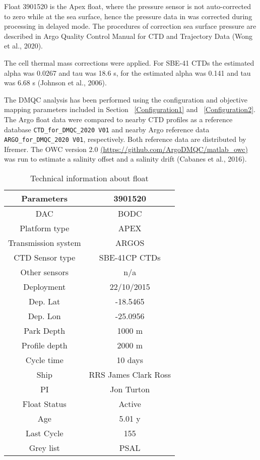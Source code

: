 \documentclass{article}
\newcommand{\WMOnum}{3901520} %
\begin{document}
\begin{flushleft}
\medskip
Float \WMOnum\hspace{0.5mm} is the Apex float, where the pressure sensor is not auto-corrected to zero while at the sea surface, hence the pressure data in was corrected during processing in delayed mode. The procedures of correction sea surface pressure are described in Argo Quality Control Manual for CTD and Trajectory Data (Wong et al., 2020).

\medskip
The cell thermal mass corrections were applied. For SBE-41 CTDs the estimated alpha was 0.0267 and tau was 18.6 s, for the estimated alpha was 0.141 and tau was 6.68 s (Johnson et al., 2006).

\medskip
The DMQC analysis has been performed using the configuration and objective mapping parameters included in Section ~\ref{Configuration1} and ~\ref{Configuration2}. The Argo float data were compared to nearby CTD profiles as a reference database \texttt{CTD\_for\_DMQC\_2020 V01} and nearby Argo reference data \texttt{ARGO\_for\_DMQC\_2020 V01}, respectively. Both reference data are distributed by Ifremer. The OWC version 2.0 \href{url}{(https://github.com/ArgoDMQC/matlab\_owc)} was run to estimate a salinity offset and a salinity drift (Cabanes et al., 2016). 

\begin{table}[!ht]%
\caption{Technical information about float }
\label{tab1}
	\centering
\begin{tabular}{|c|c|}
	\hline
	{Parameters} &  {\WMOnum} \\ \hline
	{DAC} & { BODC} \\ \hline 
	{Platform type} & {APEX} \\ \hline 
	{Transmission system} & {ARGOS} \\ \hline 
	{CTD Sensor type} & { SBE-41CP CTDs} \\ \hline 
	{Other sensors} & { n/a} \\ \hline 
	{Deployment} & { 22/10/2015} \\ \hline 
	{Dep. Lat} & { -18.5465} \\ \hline 
	{Dep. Lon} & { -25.0956} \\ \hline 
	{Park Depth} & { 1000 m} \\ \hline 
	{Profile depth} & { 2000 m} \\ \hline 
	{Cycle time} & { 10 days} \\ \hline 
	{Ship} & {RRS James Clark Ross} \\ \hline
	{PI} & {Jon Turton} \\ \hline 
	{Float Status} & { Active} \\ \hline 
	{Age} & { 5.01 y} \\ \hline 
	{Last Cycle} & { 155} \\ \hline 
	{Grey list} & { PSAL} \\ \hline
	

\end{tabular}
\end{table}
\end{flushleft}
\end{document}
